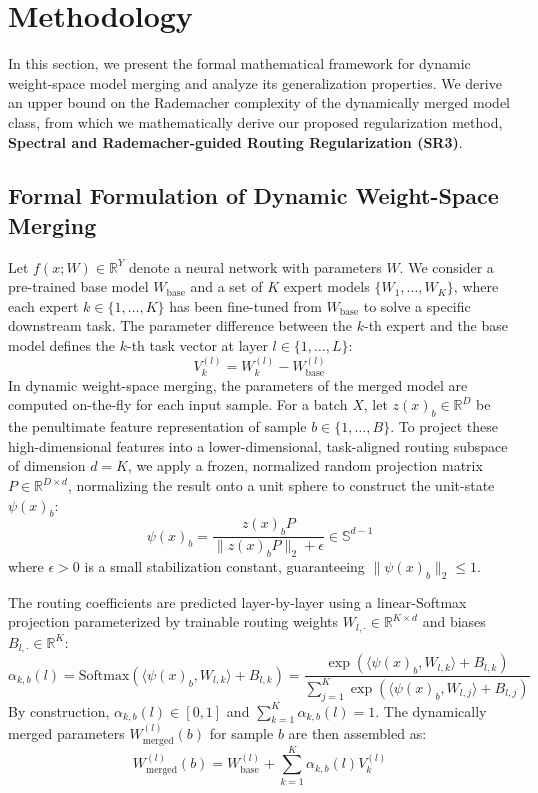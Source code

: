 \section{Methodology}
\label{sec:method}

In this section, we present the formal mathematical framework for dynamic weight-space model merging and analyze its generalization properties. We derive an upper bound on the Rademacher complexity of the dynamically merged model class, from which we mathematically derive our proposed regularization method, \textbf{Spectral and Rademacher-guided Routing Regularization (SR3)}.

\subsection{Formal Formulation of Dynamic Weight-Space Merging}
Let $f(x; W) \in \mathbb{R}^Y$ denote a neural network with parameters $W$. We consider a pre-trained base model $W_{\text{base}}$ and a set of $K$ expert models $\{W_1, \dots, W_K\}$, where each expert $k \in \{1, \dots, K\}$ has been fine-tuned from $W_{\text{base}}$ to solve a specific downstream task. The parameter difference between the $k$-th expert and the base model defines the $k$-th task vector at layer $l \in \{1,\dots,L\}$:
\begin{equation}
    V_k^{(l)} = W_k^{(l)} - W_{\text{base}}^{(l)}
\end{equation}
In dynamic weight-space merging, the parameters of the merged model are computed on-the-fly for each input sample. For a batch $X$, let $z(x)_b \in \mathbb{R}^D$ be the penultimate feature representation of sample $b \in \{1,\dots,B\}$. To project these high-dimensional features into a lower-dimensional, task-aligned routing subspace of dimension $d = K$, we apply a frozen, normalized random projection matrix $P \in \mathbb{R}^{D \times d}$, normalizing the result onto a unit sphere to construct the unit-state $\psi(x)_b$:
\begin{equation}
    \psi(x)_b = \frac{z(x)_b P}{\|z(x)_b P\|_2 + \epsilon} \in \mathbb{S}^{d-1}
\end{equation}
where $\epsilon > 0$ is a small stabilization constant, guaranteeing $\|\psi(x)_b\|_2 \le 1$.

The routing coefficients are predicted layer-by-layer using a linear-Softmax projection parameterized by trainable routing weights $W_{l, \cdot} \in \mathbb{R}^{K \times d}$ and biases $B_{l, \cdot} \in \mathbb{R}^K$:
\begin{equation}
    \alpha_{k, b}(l) = \text{Softmax}\left( \langle \psi(x)_b, W_{l, k} \rangle + B_{l, k} \right) = \frac{\exp\left( \langle \psi(x)_b, W_{l, k} \rangle + B_{l, k} \right)}{\sum_{j=1}^K \exp\left( \langle \psi(x)_b, W_{l, j} \rangle + B_{l, j} \right)}
\end{equation}
By construction, $\alpha_{k, b}(l) \in [0, 1]$ and $\sum_{k=1}^K \alpha_{k, b}(l) = 1$. The dynamically merged parameters $W_{\text{merged}}^{(l)}(b)$ for sample $b$ are then assembled as:
\begin{equation}
    W_{\text{merged}}^{(l)}(b) = W_{\text{base}}^{(l)} + \sum_{k=1}^K \alpha_{k, b}(l) V_k^{(l)}
\end{equation}


